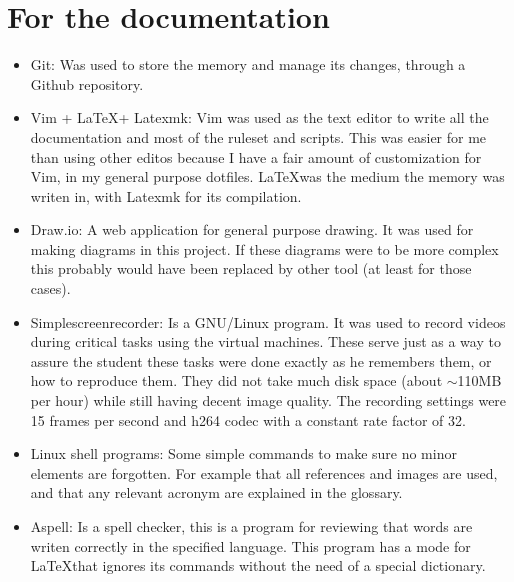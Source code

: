 \section{For the documentation}
\begin{itemize}
	\item Git: Was used to store the memory and manage its changes, through a Github repository\cite{memoria_github}.
	\item Vim + \LaTeX + Latexmk: Vim was used as the text editor to write all the documentation and most of the ruleset and scripts. This was easier for me than using other editos because I have a fair amount of customization for Vim, in my general purpose dotfiles\cite{andresgomezvidal_gitlab}. \LaTeX was the medium the memory was writen in, with Latexmk for its compilation.
	\item Draw.io: A web application for general purpose drawing\cite{drawio}. It was used for making diagrams in this project. If these diagrams were to be more complex this probably would have been replaced by other tool (at least for those cases).
	\item Simplescreenrecorder: Is a GNU/Linux program. It was used to record videos during critical tasks using the virtual machines. These serve just as a way to assure the student these tasks were done exactly as he remembers them, or how to reproduce them.
	They did not take much disk space (about $\sim$110MB per hour) while still having decent image quality. The recording settings were 15 frames per second and h264 codec with a constant rate factor of 32.
	\item Linux shell programs: Some simple commands to make sure no minor elements are forgotten. For example that all references and images are used, and that any relevant acronym are explained in the glossary.
	\item Aspell: Is a spell checker\cite{aspell}, this is a program for reviewing that words are writen correctly in the specified language. This program has a mode for \LaTeX that ignores its commands without the need of a special dictionary.
\end{itemize}

